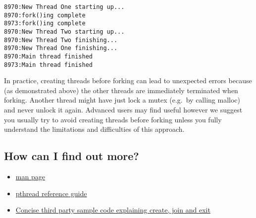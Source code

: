\begin{verbatim}
8970:New Thread One starting up...
8970:fork()ing complete
8973:fork()ing complete
8970:New Thread Two starting up...
8970:New Thread Two finishing...
8970:New Thread One finishing...
8970:Main thread finished
8973:Main thread finished
\end{verbatim}

In practice, creating threads before forking can lead to unexpected errors because (as demonstrated above) the other threads are immediately terminated when forking. Another thread might have just lock a mutex (e.g.~by calling malloc) and never unlock it again. Advanced users may find  useful however we suggest you usually try to avoid creating threads before forking unless you fully understand the limitations and difficulties of this approach.

\subsection{How can I find out more?}\label{how-can-i-find-out-more}

\begin{itemize}
\item \href{http://man7.org/linux/man-pages/man3/pthread_create.3.html}{man page} 
\item \href{http://man7.org/linux/man-pages/man7/pthreads.7.html}{pthread reference guide} 
\item \href{http://www.thegeekstuff.com/2012/04/terminate-c-thread/}{Concise third party sample code explaining create, join and exit}
\end{itemize}


